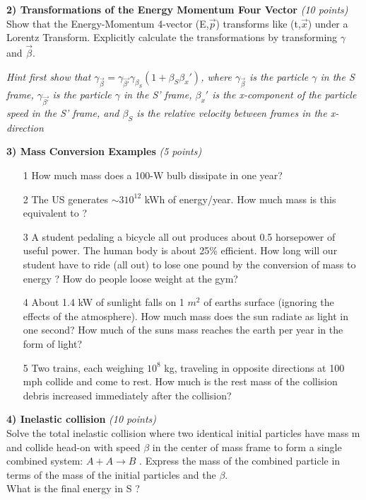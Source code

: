{\large
\textbf{2) Transformations of the Energy Momentum Four Vector } \hfill \textit{(10 points)}\\
Show that the Energy-Momentum 4-vector (E,$\vec{p}$) transforms like (t,$\vec{x}$) under a Lorentz Transform.
Explicitly calculate the transformations by transforming $\gamma$ and $\vec{\beta}$.

\textit{Hint first show that $\gamma_{\vec{\beta}} = \gamma_{\vec{\beta'}}\gamma_{\beta_S}(1+\beta_{S} \beta_{x}')$,
where $\gamma_{\vec{\beta}}$ is the particle $\gamma$ in the S frame,
      $\gamma_{\vec{\beta'}}$ is the particle $\gamma$ in the S' frame, $\beta_{x}'$ is the x-component of the particle speed in the S' frame, and $\beta_{S}$ is the relative velocity between frames in the x-direction}


\vspace*{0.25in}

\textbf{3) Mass Conversion Examples } \hfill \textit{(5 points)}\\
\begin{itemize}
\item[1] How much mass does a 100-W bulb dissipate in one year?
\item[2] The US generates $\sim 3 10^{12}$ kWh of energy/year. How much mass is this equivalent to ?
\item[3] A student pedaling a bicycle all out produces about 0.5 horsepower of useful power. The human body is about 25\% efficient.
         How long will our student have to ride (all out) to lose one pound by the conversion of mass to energy ? How do people loose weight at the gym?
\item[4] About 1.4 kW of sunlight falls on 1 $m^2$ of earths surface (ignoring the effects of the atmosphere). How much mass does the sun radiate as light in one second?
         How much of the suns mass reaches the earth per year in the form of light?
\item[5] Two trains, each weighing $10^8$ kg, traveling in opposite directions at 100 mph collide and come to rest. How much is the rest mass of the collision debris increased immediately after the collision?
\end{itemize}

\vspace*{0.25in}

\textbf{4) Inelastic collision } \hfill \textit{(10 points)}\\
Solve the total inelastic collision where two identical initial particles have mass m and collide head-on with speed $\beta$ in the center of mass frame to form a single combined system: $A + A \rightarrow B$ . 
Express the mass of the combined particle in terms of the mass of the initial particles and the $\beta$.\\
What is the final energy in S ?

}
